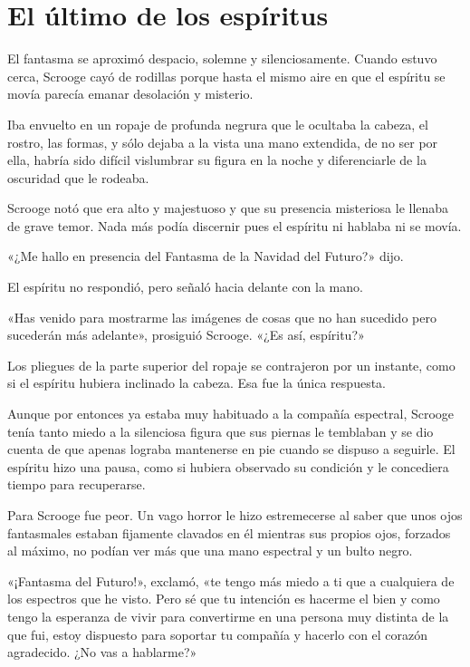\documentclass{novela}
\begin{document}

 \chapter{El último de los espíritus}



 El fantasma se aproximó despacio, solemne y silenciosamente. Cuando estuvo cerca, Scrooge cayó de rodillas porque hasta el mismo aire en que el espíritu se movía parecía emanar desolación y misterio.

 Iba envuelto en un ropaje de profunda negrura que le ocultaba la cabeza, el rostro, las formas, y sólo dejaba a la vista una mano extendida, de no ser por ella, habría sido difícil vislumbrar su figura en la noche y diferenciarle de la oscuridad que le rodeaba.

 Scrooge notó que era alto y majestuoso y que su presencia misteriosa le llenaba de grave temor. Nada más podía discernir pues el espíritu ni hablaba ni se movía.

 «¿Me hallo en presencia del Fantasma de la Navidad del Futuro?» dijo.

 El espíritu no respondió, pero señaló hacia delante con la mano.

 «Has venido para mostrarme las imágenes de cosas que no han sucedido pero sucederán más adelante», prosiguió Scrooge. «¿Es así, espíritu?»

 Los pliegues de la parte superior del ropaje se contrajeron por un instante, como si el espíritu hubiera inclinado la cabeza. Esa fue la única respuesta.

 Aunque por entonces ya estaba muy habituado a la compañía espectral, Scrooge tenía tanto miedo a la silenciosa figura que sus piernas le temblaban y se dio cuenta de que apenas lograba mantenerse en pie cuando se dispuso a seguirle. El espíritu hizo una pausa, como si hubiera observado su condición y le concediera tiempo para recuperarse.

 Para Scrooge fue peor. Un vago horror le hizo estremecerse al saber que unos ojos fantasmales estaban fijamente clavados en él mientras sus propios ojos, forzados al máximo, no podían ver más que una mano espectral y un bulto negro.

 «¡Fantasma del Futuro!», exclamó, «te tengo más miedo a ti que a cualquiera de los espectros que he visto. Pero sé que tu intención es hacerme el bien y como tengo la esperanza de vivir para convertirme en una persona muy distinta de la que fui, estoy dispuesto para soportar tu compañía y hacerlo con el corazón agradecido. ¿No vas a hablarme?»
\end{document}
